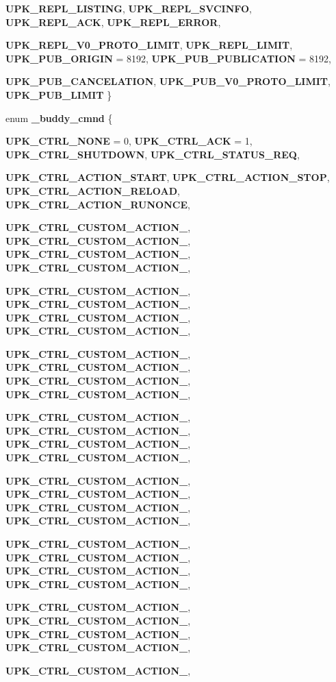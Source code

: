 \begin{DoxyCompactItemize}
{\bf UPK\_\-REPL\_\-LISTING}, 
{\bf UPK\_\-REPL\_\-SVCINFO}, 
{\bf UPK\_\-REPL\_\-ACK}, 
{\bf UPK\_\-REPL\_\-ERROR}, 
\par
{\bf UPK\_\-REPL\_\-V0\_\-PROTO\_\-LIMIT}, 
{\bf UPK\_\-REPL\_\-LIMIT}, 
{\bf UPK\_\-PUB\_\-ORIGIN} =  8192, 
{\bf UPK\_\-PUB\_\-PUBLICATION} =  8192, 
\par
{\bf UPK\_\-PUB\_\-CANCELATION}, 
{\bf UPK\_\-PUB\_\-V0\_\-PROTO\_\-LIMIT}, 
{\bf UPK\_\-PUB\_\-LIMIT}
 \}
\item 
enum {\bf \_\-buddy\_\-cmnd} \{ \par
{\bf UPK\_\-CTRL\_\-NONE} =  0, 
{\bf UPK\_\-CTRL\_\-ACK} =  1, 
{\bf UPK\_\-CTRL\_\-SHUTDOWN}, 
{\bf UPK\_\-CTRL\_\-STATUS\_\-REQ}, 
\par
{\bf UPK\_\-CTRL\_\-ACTION\_\-START}, 
{\bf UPK\_\-CTRL\_\-ACTION\_\-STOP}, 
{\bf UPK\_\-CTRL\_\-ACTION\_\-RELOAD}, 
{\bf UPK\_\-CTRL\_\-ACTION\_\-RUNONCE}, 
\par
{\bf UPK\_\-CTRL\_\-CUSTOM\_\-ACTION\_}, 
{\bf UPK\_\-CTRL\_\-CUSTOM\_\-ACTION\_}, 
{\bf UPK\_\-CTRL\_\-CUSTOM\_\-ACTION\_}, 
{\bf UPK\_\-CTRL\_\-CUSTOM\_\-ACTION\_}, 
\par
{\bf UPK\_\-CTRL\_\-CUSTOM\_\-ACTION\_}, 
{\bf UPK\_\-CTRL\_\-CUSTOM\_\-ACTION\_}, 
{\bf UPK\_\-CTRL\_\-CUSTOM\_\-ACTION\_}, 
{\bf UPK\_\-CTRL\_\-CUSTOM\_\-ACTION\_}, 
\par
{\bf UPK\_\-CTRL\_\-CUSTOM\_\-ACTION\_}, 
{\bf UPK\_\-CTRL\_\-CUSTOM\_\-ACTION\_}, 
{\bf UPK\_\-CTRL\_\-CUSTOM\_\-ACTION\_}, 
{\bf UPK\_\-CTRL\_\-CUSTOM\_\-ACTION\_}, 
\par
{\bf UPK\_\-CTRL\_\-CUSTOM\_\-ACTION\_}, 
{\bf UPK\_\-CTRL\_\-CUSTOM\_\-ACTION\_}, 
{\bf UPK\_\-CTRL\_\-CUSTOM\_\-ACTION\_}, 
{\bf UPK\_\-CTRL\_\-CUSTOM\_\-ACTION\_}, 
\par
{\bf UPK\_\-CTRL\_\-CUSTOM\_\-ACTION\_}, 
{\bf UPK\_\-CTRL\_\-CUSTOM\_\-ACTION\_}, 
{\bf UPK\_\-CTRL\_\-CUSTOM\_\-ACTION\_}, 
{\bf UPK\_\-CTRL\_\-CUSTOM\_\-ACTION\_}, 
\par
{\bf UPK\_\-CTRL\_\-CUSTOM\_\-ACTION\_}, 
{\bf UPK\_\-CTRL\_\-CUSTOM\_\-ACTION\_}, 
{\bf UPK\_\-CTRL\_\-CUSTOM\_\-ACTION\_}, 
{\bf UPK\_\-CTRL\_\-CUSTOM\_\-ACTION\_}, 
\par
{\bf UPK\_\-CTRL\_\-CUSTOM\_\-ACTION\_}, 
{\bf UPK\_\-CTRL\_\-CUSTOM\_\-ACTION\_}, 
{\bf UPK\_\-CTRL\_\-CUSTOM\_\-ACTION\_}, 
{\bf UPK\_\-CTRL\_\-CUSTOM\_\-ACTION\_}, 
\par
{\bf UPK\_\-CTRL\_\-CUSTOM\_\-ACTION\_}, 

\end{DoxyCompactItemize}
